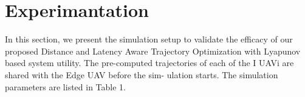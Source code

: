 \documentclass[11pt,twocolumn]{article}
\begin{document}
\section{Experimantation}
In this section, we present the simulation setup to validate the efficacy of our proposed Distance and Latency Aware Trajectory Optimization with Lyapunov based system utility. The pre-computed trajectories of each of the I UAVi are shared with the Edge UAV before the sim-
ulation starts. The simulation parameters are listed in Table 1.




\end{document}
